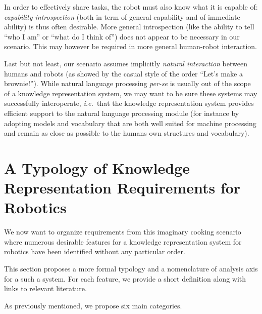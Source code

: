 \documentclass[a4paper, twocolumn]{article}
\newcommand{\ie}{{\textit{i.e.\ }}}
\begin{document}
In order to effectively share tasks, the robot must also know what it is
capable of: \emph{capability introspection} (both in term of general capability
and of immediate ability) is thus often desirable. More general introspection
(like the ability to tell ``who I am'' or ``what do I think of'') does not
appear to be necessary in our scenario. This may however be required in more
general human-robot interaction.

Last but not least, our scenario assumes implicitly \emph{natural interaction}
between humans and robots (as showed by the casual style of the
order ``Let's make a brownie!''). While natural language processing {\it
per-se} is usually out of the scope of a knowledge representation system, we
may want to be sure these systems may successfully interoperate, \ie that the
knowledge representation system provides efficient support to the natural
language processing module (for instance by adopting models and vocabulary that
are both well suited for machine processing and remain as close as possible to
the humans own structures and vocabulary).

\section{A Typology of Knowledge Representation Requirements for Robotics}
\label{sect|features}

We now want to organize requirements from this imaginary cooking scenario where
numerous desirable features for a knowledge representation system for robotics
have been identified without any particular order.

This section proposes a more formal typology and a nomenclature of analysis
axis for a such a system. For each feature, we provide a short definition along
with links to relevant literature.

As previously mentioned, we propose six main categories.

\begin{scriptsize}
\begin{center}
\end{center}
\end{scriptsize}
\end{document}
